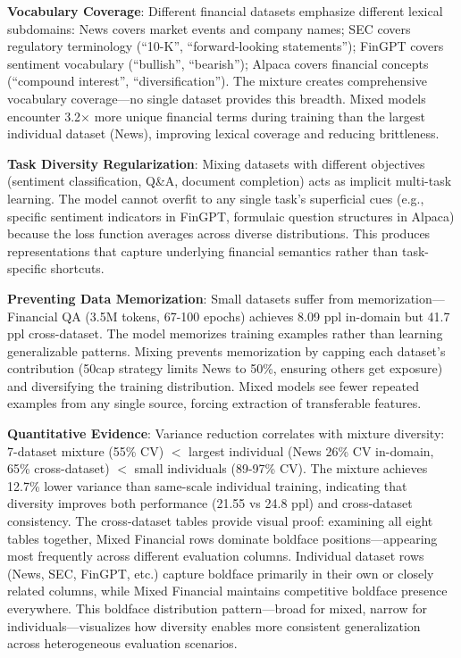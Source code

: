 \textbf{Vocabulary Coverage}: Different financial datasets emphasize different lexical subdomains: News covers market events and company names; SEC covers regulatory terminology (``10-K'', ``forward-looking statements''); FinGPT covers sentiment vocabulary (``bullish'', ``bearish''); Alpaca covers financial concepts (``compound interest'', ``diversification''). The mixture creates comprehensive vocabulary coverage—no single dataset provides this breadth. Mixed models encounter 3.2$\times$ more unique financial terms during training than the largest individual dataset (News), improving lexical coverage and reducing brittleness.

\textbf{Task Diversity Regularization}: Mixing datasets with different objectives (sentiment classification, Q\&A, document completion) acts as implicit multi-task learning. The model cannot overfit to any single task's superficial cues (e.g., specific sentiment indicators in FinGPT, formulaic question structures in Alpaca) because the loss function averages across diverse distributions. This produces representations that capture underlying financial semantics rather than task-specific shortcuts.

\textbf{Preventing Data Memorization}: Small datasets suffer from memorization—Financial QA (3.5M tokens, 67-100 epochs) achieves 8.09 ppl in-domain but 41.7 ppl cross-dataset. The model memorizes training examples rather than learning generalizable patterns. Mixing prevents memorization by capping each dataset's contribution (50cap strategy limits News to 50\%, ensuring others get exposure) and diversifying the training distribution. Mixed models see fewer repeated examples from any single source, forcing extraction of transferable features.

\textbf{Quantitative Evidence}: Variance reduction correlates with mixture diversity: 7-dataset mixture (55\% CV) $<$ largest individual (News 26\% CV in-domain, 65\% cross-dataset) $<$ small individuals (89-97\% CV). The mixture achieves 12.7\% lower variance than same-scale individual training, indicating that diversity improves both performance (21.55 vs 24.8 ppl) and cross-dataset consistency. The cross-dataset tables provide visual proof: examining all eight tables together, Mixed Financial rows dominate boldface positions—appearing most frequently across different evaluation columns. Individual dataset rows (News, SEC, FinGPT, etc.) capture boldface primarily in their own or closely related columns, while Mixed Financial maintains competitive boldface presence everywhere. This boldface distribution pattern—broad for mixed, narrow for individuals—visualizes how diversity enables more consistent generalization across heterogeneous evaluation scenarios.


